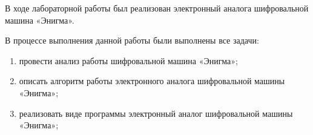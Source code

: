 
В ходе лабораторной работы был реализован электронный аналога шифровальной машина «Энигма».

В процессе выполнения данной работы были выполнены все задачи:
\begin{enumerate}
	\item провести анализ работы шифровальной машина «Энигма»;
	\item описать алгоритм работы электронного аналога шифровальной машины «Энигма»;
	\item реализовать виде программы электронный аналог шифровальной машины «Энигма»;
\end{enumerate}
